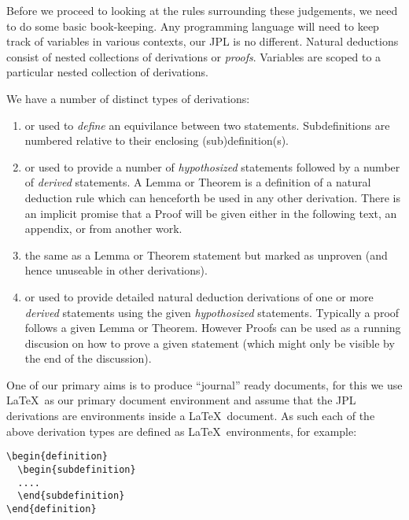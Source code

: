 \documentclass[a4paper,openany]{amsbook}
\begin{document}
Before we proceed to looking at the rules surrounding these judgements, we need
to do some basic book-keeping. Any programming language will need to keep track
of variables in various contexts, our JPL is no different.  Natural deductions
consist of nested collections of derivations or \emph{proofs}.  Variables are
scoped to a particular nested collection of derivations.

We have a number of distinct types of derivations:
\begin{enumerate}
  \item {} or  used to \emph{define}
  an equivilance between two statements. Subdefinitions are numbered relative
  to their enclosing (sub)definition(s).
  \item {} or  used to provide a number of
  \emph{hypothosized} statements followed by a number of \emph{derived}
  statements. A Lemma or Theorem is a definition of a natural deduction rule
  which can henceforth be used in any other derivation. There is an implicit
  promise that a Proof will be given either in the following text, an appendix,
  or from another work.
  \item {} the same as a Lemma or Theorem statement but marked
  as unproven (and hence unuseable in other derivations).
  \item {} or  used to provide detailed natural
  deduction derivations of one or more \emph{derived} statements using the given
  \emph{hypothosized} statements. Typically a proof follows a given Lemma or
  Theorem.  However Proofs can be used as a running discusion on how to prove a
  given statement (which might only be visible by the end of the discussion).
\end{enumerate}

One of our primary aims is to produce ``journal'' ready documents, for this we
use \LaTeX\ as our primary document environment and assume that the JPL
derivations are environments inside a \LaTeX\ document. As such each of the
above derivation types are defined as \LaTeX\ environments, for example:
\begin{verbatim}
\begin{definition}
  \begin{subdefinition}
  ....
  \end{subdefinition}
\end{definition}
\end{verbatim}
\end{document}

